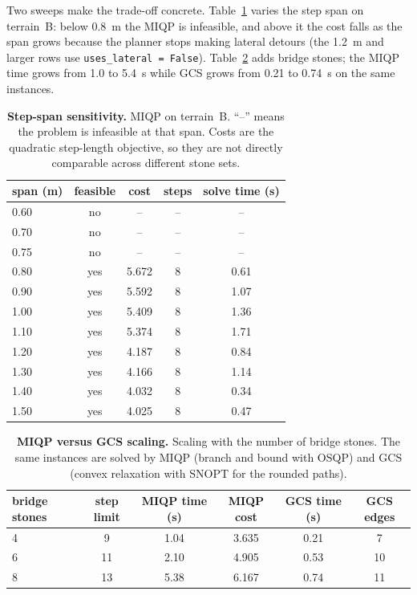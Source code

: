 \documentclass[11pt]{report}
\begin{document}
Two sweeps make the trade-off concrete.  Table~\ref{tab:footstep-span} varies
the step span on terrain~B: below 0.8~m the MIQP is infeasible, and above it
the cost falls as the span grows because the planner stops making lateral
detours (the 1.2~m and larger rows use \texttt{uses\_lateral = False}).
Table~\ref{tab:footstep-scaling} adds bridge stones; the MIQP time grows from
1.0 to 5.4~s while GCS grows from 0.21 to 0.74~s on the same instances.

\begin{table}[!htbp]
\centering
\small
\caption{\textbf{Step-span sensitivity.}  MIQP on terrain~B.  ``--'' means the
problem is infeasible at that span.  Costs are the quadratic step-length
objective, so they are not directly comparable across different stone sets.}
\label{tab:footstep-span}
\begin{tabular}{@{}lcccc@{}}
\toprule
span (m) & feasible & cost & steps & solve time (s) \\
\midrule
0.60 & no  & --    & -- & -- \\
0.70 & no  & --    & -- & -- \\
0.75 & no  & --    & -- & -- \\
0.80 & yes & 5.672 & 8 & 0.61 \\
0.90 & yes & 5.592 & 8 & 1.07 \\
1.00 & yes & 5.409 & 8 & 1.36 \\
1.10 & yes & 5.374 & 8 & 1.71 \\
1.20 & yes & 4.187 & 8 & 0.84 \\
1.30 & yes & 4.166 & 8 & 1.14 \\
1.40 & yes & 4.032 & 8 & 0.34 \\
1.50 & yes & 4.025 & 8 & 0.47 \\
\bottomrule
\end{tabular}
\end{table}

\begin{table}[!htbp]
\centering
\small
\caption{\textbf{MIQP versus GCS scaling.}  Scaling with the number of bridge stones.  The same instances are
solved by MIQP (branch and bound with OSQP) and GCS (convex relaxation with
SNOPT for the rounded paths).}
\label{tab:footstep-scaling}
\begin{tabular}{@{}lccccc@{}}
\toprule
bridge stones & step limit & MIQP time (s) & MIQP cost &
GCS time (s) & GCS edges \\
\midrule
4 & 9  & 1.04 & 3.635 & 0.21 & 7 \\
6 & 11 & 2.10 & 4.905 & 0.53 & 10 \\
8 & 13 & 5.38 & 6.167 & 0.74 & 11 \\
\bottomrule
\end{tabular}
\end{table}
\end{document}

